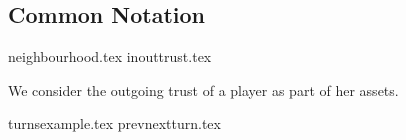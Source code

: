 \subsection{Common Notation}
{neighbourhood.tex}
{inouttrust.tex}

We consider the outgoing trust of a player as part of her assets.

{turnsexample.tex}
{prevnextturn.tex}
